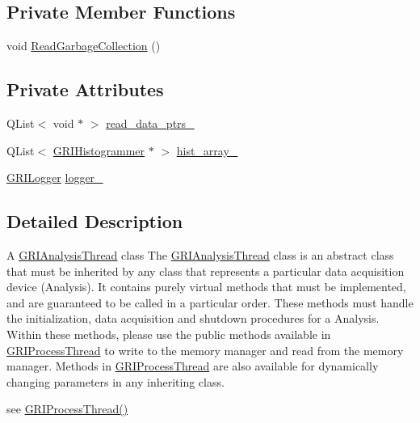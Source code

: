 \subsection*{\-Private \-Member \-Functions}
\begin{DoxyCompactItemize}
\item 
void \hyperlink{classGRIAnalysisThread_ae1f9fea007498b70ac7db6d16dbd0975}{\-Read\-Garbage\-Collection} ()
\end{DoxyCompactItemize}
\subsection*{\-Private \-Attributes}
\begin{DoxyCompactItemize}
\item 
\-Q\-List$<$ void $\ast$ $>$ \hyperlink{classGRIAnalysisThread_af79d2707cdbc93665ff4e69ace5532b6}{read\-\_\-data\-\_\-ptrs\-\_\-}
\item 
\-Q\-List$<$ \hyperlink{classGRIHistogrammer}{\-G\-R\-I\-Histogrammer} $\ast$ $>$ \hyperlink{classGRIAnalysisThread_ab42ada68a0de30979eea4443586706ff}{hist\-\_\-array\-\_\-}
\item 
\hyperlink{classGRILogger}{\-G\-R\-I\-Logger} \hyperlink{classGRIAnalysisThread_a1069f7fb1b6dd01e0da864a85748c83f}{logger\-\_\-}
\end{DoxyCompactItemize}


\subsection{\-Detailed \-Description}
\-A \hyperlink{classGRIAnalysisThread}{\-G\-R\-I\-Analysis\-Thread} class \-The \hyperlink{classGRIAnalysisThread}{\-G\-R\-I\-Analysis\-Thread} class is an abstract class that must be inherited by any class that represents a particular data acquisition device (\-Analysis). \-It contains purely virtual methods that must be implemented, and are guaranteed to be called in a particular order. \-These methods must handle the initialization, data acquisition and shutdown procedures for a \-Analysis. \-Within these methods, please use the public methods available in \hyperlink{classGRIProcessThread}{\-G\-R\-I\-Process\-Thread} to write to the memory manager and read from the memory manager. \-Methods in \hyperlink{classGRIProcessThread}{\-G\-R\-I\-Process\-Thread} are also available for dynamically changing parameters in any inheriting class.

see \hyperlink{classGRIProcessThread_af1890e0d920278fb3e25a7529cc2344b}{\-G\-R\-I\-Process\-Thread()}

